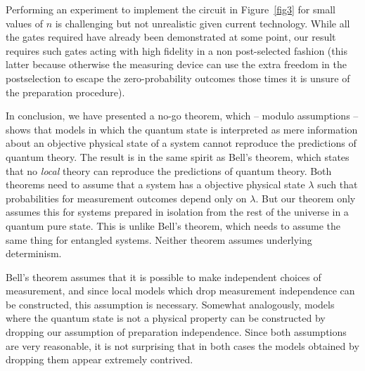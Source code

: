 \documentclass[amsmath,amssymb,superscriptaddress,twocolumn,pra]{revtex4-1}
\begin{document}
Performing an experiment to implement the circuit in Figure~\ref{fig3} for small values of $n$ is challenging but not unrealistic given current technology. While all the gates required have already been demonstrated at some point, our result requires such gates acting with high fidelity in a non post-selected fashion (this latter because otherwise the measuring device can use the extra freedom in the postselection to escape the zero-probability outcomes those times it is unsure of the preparation procedure).

In conclusion, we have presented a no-go theorem, which -- modulo assumptions -- shows that models in which the quantum state is interpreted as mere information about an objective physical state of a system cannot reproduce the predictions of quantum theory. The result is in the same spirit as Bell's theorem\cite{bell}, which states that no \emph{local} theory can reproduce the predictions of quantum theory. Both theorems need to assume that a system has a objective physical state $\lambda$ such that probabilities for measurement outcomes depend only on $\lambda$. But our theorem only assumes this for systems prepared in isolation from the rest of the universe in a quantum pure state. This is unlike Bell's theorem, which needs to assume the same thing for entangled systems. Neither theorem assumes underlying determinism.

Bell's theorem assumes that it is possible to make independent choices of measurement, and since local models which drop measurement independence can be constructed\cite{indep,indep2}, this assumption is necessary.  Somewhat analogously, models where the quantum state is not a physical property can be constructed by dropping our assumption of preparation independence\cite{ljbr}. Since both assumptions are very reasonable, it is not surprising that in both cases the models obtained by dropping them appear extremely contrived.
\end{document}
